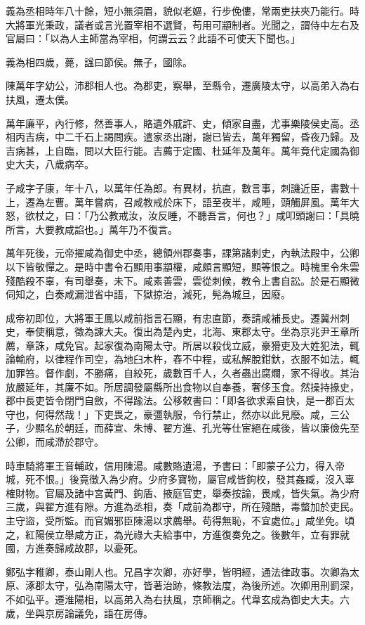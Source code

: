 \begin{pinyinscope}
義為丞相時年八十餘，短小無須眉，貌似老嫗，行步俛僂，常兩吏扶夾乃能行。時大將軍光秉政，議者或言光置宰相不選賢，苟用可顓制者。光聞之，謂侍中左右及官屬曰：「以為人主師當為宰相，何謂云云？此語不可使天下聞也。」

義為相四歲，薨，諡曰節侯。無子，國除。

陳萬年字幼公，沛郡相人也。為郡吏，察舉，至縣令，遷廣陵太守，以高弟入為右扶風，遷太僕。

萬年廉平，內行修，然善事人，賂遺外戚許、史，傾家自盡，尤事樂陵侯史高。丞相丙吉病，中二千石上謁問疾。遣家丞出謝，謝已皆去，萬年獨留，昏夜乃歸。及吉病甚，上自臨，問以大臣行能。吉薦于定國、杜延年及萬年。萬年竟代定國為御史大夫，八歲病卒。

子咸字子康，年十八，以萬年任為郎。有異材，抗直，數言事，刺譏近臣，書數十上，遷為左曹。萬年嘗病，召咸教戒於床下，語至夜半，咸睡，頭觸屏風。萬年大怒，欲杖之，曰：「乃公教戒汝，汝反睡，不聽吾言，何也？」咸叩頭謝曰：「具曉所言，大要教咸諂也。」萬年乃不復言。

萬年死後，元帝擢咸為御史中丞，總領州郡奏事，課第諸刺史，內執法殿中，公卿以下皆敬憚之。是時中書令石顯用事顓權，咸頗言顯短，顯等恨之。時槐里令朱雲殘酷殺不辜，有司舉奏，未下。咸素善雲，雲從刺候，教令上書自訟。於是石顯微伺知之，白奏咸漏泄省中語，下獄掠治，減死，髡為城旦，因廢。

成帝初即位，大將軍王鳳以咸前指言石顯，有忠直節，奏請咸補長史。遷冀州刺史，奉使稱意，徵為諫大夫。復出為楚內史，北海、東郡太守。坐為京兆尹王章所薦，章誅，咸免官。起家復為南陽太守。所居以殺伐立威，豪猾吏及大姓犯法，輒論輸府，以律程作司空，為地臼木杵，舂不中程，或私解脫鉗釱，衣服不如法，輒加罪笞。督作劇，不勝痛，自絞死，歲數百千人，久者蟲出腐爛，家不得收。其治放嚴延年，其廉不如。所居調發屬縣所出食物以自奉養，奢侈玉食。然操持掾史，郡中長吏皆令閉門自斂，不得踰法。公移敕書曰：「即各欲求索自快，是一郡百太守也，何得然哉！」下吏畏之，豪彊執服，令行禁止，然亦以此見廢。咸，三公子，少顯名於朝廷，而薛宣、朱博、翟方進、孔光等仕宦絕在咸後，皆以廉儉先至公卿，而咸滯於郡守。

時車騎將軍王音輔政，信用陳湯。咸數賂遺湯，予書曰：「即蒙子公力，得入帝城，死不恨。」後竟徵入為少府。少府多寶物，屬官咸皆鉤校，發其姦臧，沒入辜榷財物。官屬及諸中宮黃門、鉤盾、掖庭官吏，舉奏按論，畏咸，皆失氣。為少府三歲，與翟方進有隙。方進為丞相，奏「咸前為郡守，所在殘酷，毒螫加於吏民。主守盜，受所監。而官媚邪臣陳湯以求薦舉。苟得無恥，不宜處位。」咸坐免。頃之，紅陽侯立舉咸方正，為光祿大夫給事中，方進復奏免之。後數年，立有罪就國，方進奏歸咸故郡，以憂死。

鄭弘字稚卿，泰山剛人也。兄昌字次卿，亦好學，皆明經，通法律政事。次卿為太原、涿郡太守，弘為南陽太守，皆著治跡，條教法度，為後所述。次卿用刑罰深，不如弘平。遷淮陽相，以高弟入為右扶風，京師稱之。代韋玄成為御史大夫。六歲，坐與京房論議免，語在房傳。


\end{pinyinscope}
